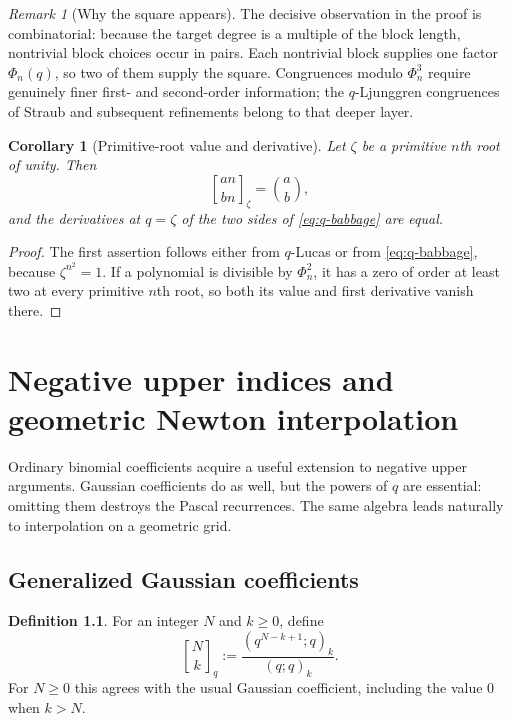 \documentclass[11pt,oneside,openany]{book}
\newtheorem{corollary}[corollary]{Corollary}
\theoremstyle{definition}
\newtheorem{definition}[definition]{Definition}
\theoremstyle{remark}
\newtheorem{remark}[remark]{Remark}
\newcommand{\Qbinom}[3]{\genfrac{[}{]}{0pt}{}{#1}{#2}_{#3}}
\begin{document}
\begin{remark}[Why the square appears]
The decisive observation in the proof is combinatorial: because the target degree is a multiple of the block length, nontrivial block choices occur in pairs.  Each nontrivial block supplies one factor $\Phi_n(q)$, so two of them supply the square.  Congruences modulo $\Phi_n^3$ require genuinely finer first- and second-order information; the $q$-Ljunggren congruences of Straub and subsequent refinements belong to that deeper layer.
\end{remark}

\begin{corollary}[Primitive-root value and derivative]\label{cor:babbage-derivative}
Let $\zeta$ be a primitive $n$th root of unity.  Then
\[
 \Qbinom{an}{bn}{\zeta}=\binom ab,
\]
and the derivatives at $q=\zeta$ of the two sides of \eqref{eq:q-babbage} are equal.
\end{corollary}

\begin{proof}
The first assertion follows either from $q$-Lucas or from \eqref{eq:q-babbage}, because $\zeta^{n^2}=1$.  If a polynomial is divisible by $\Phi_n^2$, it has a zero of order at least two at every primitive $n$th root, so both its value and first derivative vanish there.
\end{proof}

\chapter{Negative upper indices and geometric Newton interpolation}\label{chap:qnewton}

Ordinary binomial coefficients acquire a useful extension to negative upper arguments.  Gaussian coefficients do as well, but the powers of $q$ are essential: omitting them destroys the Pascal recurrences.  The same algebra leads naturally to interpolation on a geometric grid.

\section{Generalized Gaussian coefficients}

\begin{definition}
For an integer $N$ and $k\ge0$, define
\[
 \Qbinom Nkq
 :=\frac{(q^{N-k+1};q)_k}{(q;q)_k}.
 \tag{17.1}\label{eq:generalized-gaussian}
\]
For $N\ge0$ this agrees with the usual Gaussian coefficient, including the value $0$ when $k>N$.
\end{definition}
\end{document}

